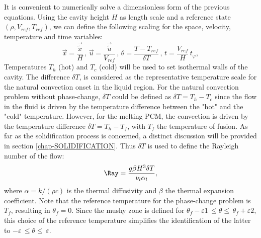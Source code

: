 It is convenient to numerically solve a dimensionless form of the previous equations.
Using the cavity height $H$ as length scale and a reference state $(\rho, V_{ref}, T_{ref})$, we can define the following scaling for the space, velocity, temperature and time variables:
\begin{equation}\label{eq-adim}
\vec{x} = \frac{\vec{\tilde{x}}}{H} \, , \,  \vec{u} = \frac{\vec{\tilde{u}}}{V_{ref}} \, , \,  \theta = \frac{T-T_{ref}}{\delta T} \, , \,  t = \frac{V_{ref}}{H} \, t_{\varphi},
\end{equation}
Temperatures $T_h$ (hot) and $T_c$ (cold) will be used to set isothermal walls of the cavity. The difference $\delta T$, 
is considered as the representative temperature scale  for the natural convection onset in the liquid region. 
For the natural convection problem without phase-change, $\delta T$ could be defined as $\delta T=T_{h}-T_{c}$ since the flow in the fluid is driven by the temperature difference between the "hot" and the "cold" temperature.
However, for the melting PCM, the convection is driven by the temperature difference $\delta T=T_{h}-T_{f}$, with $T_f$ the temperature of fusion.
As far as the solidification process is concerned, a distinct discussion will be provided in section \ref{chap-SOLIDIFICATION}. %
Thus $\delta T$ is used to define the Rayleigh number of the flow:
\begin{equation}
\label{eq-Rayleigh}
\Ray = \frac{g \beta H^3 \delta T}{\nu_l \alpha_l},
\end{equation}
where $\alpha = k/(\rho c)$ is the thermal diffusivity and  $\beta$ the thermal expansion coefficient. 
Note that the reference temperature for the phase-change problem is   $T_f$, resulting in  $\theta_f = 0$.
Since the mushy zone is defined for  $  \theta_f - \varepsilon1 \, \leq \theta \leq \, \theta_f + \varepsilon2 $, this choice of the reference temperature 
simplifies the identification of the latter to  $  -\varepsilon \, \leq \theta \leq \,\varepsilon $.

